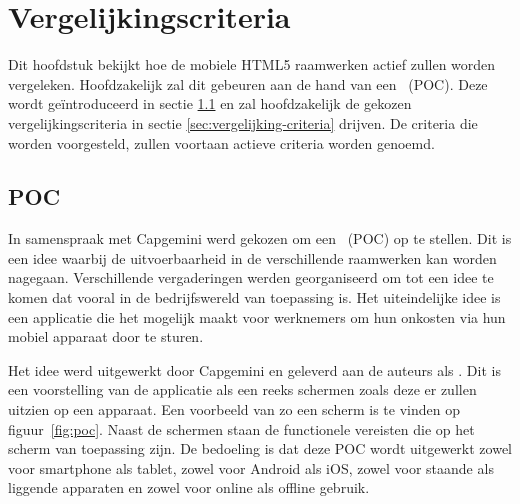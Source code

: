 \chapter{Vergelijkingscriteria}
\label{chap:vergelijkingscriteria}

Dit hoofdstuk bekijkt hoe de mobiele HTML5 raamwerken actief zullen worden vergeleken.
Hoofdzakelijk zal dit gebeuren aan de hand van een ~(POC).
Deze wordt geïntroduceerd in sectie \ref{sec:vergelijking-poc} en zal hoofdzakelijk de gekozen vergelijkingscriteria in sectie \ref{sec:vergelijking-criteria} drijven.
De criteria die worden voorgesteld, zullen voortaan actieve criteria worden genoemd.


\section{POC}
\label{sec:vergelijking-poc}
In samenspraak met Capgemini werd gekozen om een ~(POC) op te stellen.
Dit is een idee waarbij de uitvoerbaarheid in de verschillende raamwerken kan worden nagegaan.
Verschillende vergaderingen werden georganiseerd om tot een idee te komen dat vooral in de bedrijfswereld van toepassing is.
Het uiteindelijke idee is een applicatie die het mogelijk maakt voor werknemers om hun onkosten via hun mobiel apparaat door te sturen.

Het idee werd uitgewerkt door Capgemini en geleverd aan de auteurs als .
Dit is een voorstelling van de applicatie als een reeks schermen zoals deze er zullen uitzien op een apparaat. 
Een voorbeeld van zo een scherm is te vinden op figuur~\ref{fig:poc}. 
Naast de schermen staan de functionele vereisten die op het scherm van toepassing zijn.
De bedoeling is dat deze POC wordt uitgewerkt zowel voor smartphone als tablet, zowel voor Android als iOS, zowel voor staande als liggende apparaten en zowel voor online als offline gebruik.

